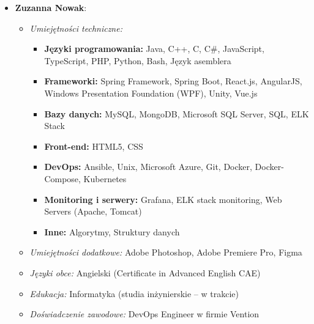 \documentclass[12pt,a4paper]{book}
\begin{document}
\begin{itemize}
  \item \textbf{Zuzanna Nowak}:
    \begin{itemize}
        \item \textit{Umiejętności techniczne:} 
        \begin{itemize}
            \item \textbf{Języki programowania:} Java, C++, C, C\#, JavaScript, TypeScript, PHP, Python, Bash, Język asemblera
            \item \textbf{Frameworki:} Spring Framework, Spring Boot, React.js, AngularJS, Windows Presentation Foundation (WPF), Unity, Vue.js
            \item \textbf{Bazy danych:} MySQL, MongoDB, Microsoft SQL Server, SQL, ELK Stack
            \item \textbf{Front-end:} HTML5, CSS
            \item \textbf{DevOps:} Ansible, Unix, Microsoft Azure, Git, Docker, Docker-Compose, Kubernetes
            \item \textbf{Monitoring i serwery:} Grafana, ELK stack monitoring, Web Servers (Apache, Tomcat)
            \item \textbf{Inne:} Algorytmy, Struktury danych
        \end{itemize}
        \item \textit{Umiejętności dodatkowe:} Adobe Photoshop, Adobe Premiere Pro, Figma
        \item \textit{Języki obce:} Angielski (Certificate in Advanced English CAE)
        \item \textit{Edukacja:} Informatyka (studia inżynierskie – w trakcie)
        \item \textit{Doświadczenie zawodowe:} DevOps Engineer w firmie Vention
    \end{itemize}
    

\end{itemize}
\end{document}
